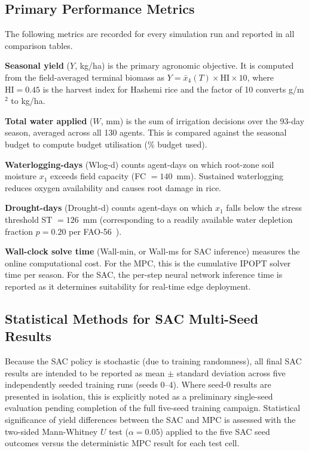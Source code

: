 \subsection{Primary Performance Metrics}

The following metrics are recorded for every simulation run and reported in all
comparison tables.

\textbf{Seasonal yield} ($Y$, kg/ha) is the primary agronomic objective.
It is computed from the field-averaged terminal biomass as
$Y = \bar{x}_4(T) \times \mathrm{HI} \times 10$,
where $\mathrm{HI} = 0.45$ is the harvest index for Hashemi rice and the factor of 10
converts g/m$^2$ to kg/ha.

\textbf{Total water applied} ($W$, mm) is the sum of irrigation decisions over the
93-day season, averaged across all 130 agents.  This is compared against the seasonal
budget to compute budget utilisation (\% budget used).

\textbf{Waterlogging-days} (Wlog-d) counts agent-days on which root-zone soil moisture
$x_1$ exceeds field capacity (FC $= 140$~mm).  Sustained waterlogging reduces oxygen
availability and causes root damage in rice.

\textbf{Drought-days} (Drought-d) counts agent-days on which $x_1$ falls below the
stress threshold ST $= 126$~mm (corresponding to a readily available water depletion
fraction $p = 0.20$ per FAO-56~\cite{allen1998crop}).

\textbf{Wall-clock solve time} (Wall-min, or Wall-ms for SAC inference) measures the
online computational cost.  For the MPC, this is the cumulative IPOPT solver time per
season.  For the SAC, the per-step neural network inference time is reported as it
determines suitability for real-time edge deployment.

\subsection{Statistical Methods for SAC Multi-Seed Results}

Because the SAC policy is stochastic (due to training randomness), all final SAC results
are intended to be reported as mean $\pm$ standard deviation across five independently
seeded training runs (seeds 0--4).
Where seed-0 results are presented in isolation, this is explicitly noted as a
preliminary single-seed evaluation pending completion of the full five-seed training
campaign.
Statistical significance of yield differences between the SAC and MPC is assessed with
the two-sided Mann-Whitney $U$ test ($\alpha = 0.05$) applied to the five SAC seed
outcomes versus the deterministic MPC result for each test cell.

